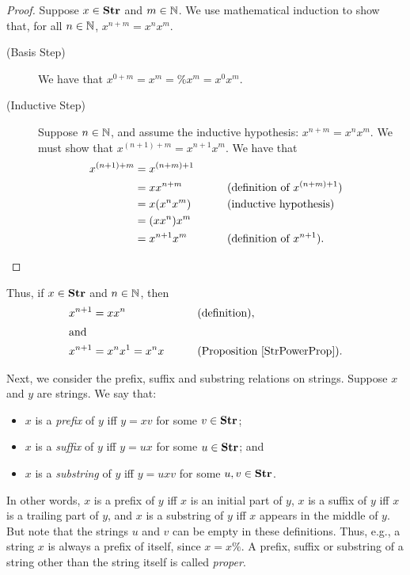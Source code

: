 \begin{proof}
Suppose $x\in\mathbf{Str}$ and $m\in\mathbb{N}$.  We use mathematical induction
%
to show that, for all $n\in\mathbb{N}$, $x^{n+m} = x^nx^m$.
\begin{description}
\item[\quad(Basis Step)] We have that $x^{0+m}=x^m=\%x^m=x^0x^m$.

\item[\quad(Inductive Step)] Suppose $n\in\mathbb{N}$, and assume the
inductive hypothesis: $x^{n+m} = x^nx^m$.  We must show
that $x^{(n+1)+m} = x^{n+1}x^m$.  We have that
\begin{alignat*}{2}
x^{(n+1)+m} &= x^{(n+m)+1} \\
            &= xx^{n+m} && \qquad{\textrm{(definition of $x^{(n+m)+1}$)}} \\
            &= x(x^nx^m) && \qquad{\textrm{(inductive hypothesis)}} \\
            &= (xx^n)x^m \\
            &= x^{n+1}x^m && \qquad{\textrm{(definition of $x^{n+1}$)}} .
\end{alignat*}
\end{description}
\end{proof}

Thus, if $x\in\mathbf{Str}$ and $n\in\mathbb{N}$, then
\begin{alignat*}{2}
x^{n+1} &= xx^n && \qquad{\textrm{(definition)}}, \\
\intertext{and}
x^{n+1} &= x^nx^1 = x^nx && \qquad{\textrm{(Proposition~\ref{StrPowerProp})}} .
\end{alignat*}

Next, we consider the prefix, suffix and substring relations on
strings.  Suppose $x$ and $y$ are strings.  We say that:
\begin{itemize}
\item $x$ is a \emph{prefix} of $y$ iff $y=xv$ for some $v\in\mathbf{Str}$;
%
%

\item $x$ is a \emph{suffix} of $y$ iff $y=ux$ for some $u\in\mathbf{Str}$; and
%
%

\item $x$ is a \emph{substring} of $y$ iff $y=uxv$ for some $u,v\in\mathbf{Str}$.
%
%
\end{itemize}
In other words, $x$ is a prefix of $y$ iff $x$ is an initial part of
$y$, $x$ is a suffix of $y$ iff $x$ is a trailing part of $y$, and $x$
is a substring of $y$ iff $x$ appears in the middle of $y$.  But note
that the strings $u$ and $v$ can be empty in these definitions.  Thus,
e.g., a string $x$ is always a prefix of itself, since $x=x\%$.  A
prefix, suffix or substring of a string other than the string itself
is called \emph{proper}.
%
%
%
%
%
%
%
%
%

